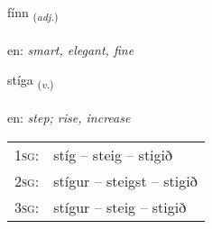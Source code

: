 \documentclass[frontgrid, backgrid]{flacards}\usepackage[]{graphicx}\usepackage[]{color}
\begin{document}
\renewcommand{\flhead}{\vskip5pt \fboxsep=0pt {\small\bfseries\footnotesize Lýsingarorð | Adjective}}
\renewcommand{\fcfoot}{\vskip5pt \fboxsep=0pt \hspace{2pt}{\small\bfseries\footnotesize 2K}}

\renewcommand{\blhead}{\vskip5pt {\small\bfseries\footnotesize Lýsingarorð | Adjective }}
\renewcommand{\bcfoot}{\vskip5pt \hspace{2pt}{\small\bfseries\footnotesize 2K}}


{fínn \small{\textsubscript{(\textit{adj.})}} \\[1ex] %
\textphonetic{[fitn̥]} \\
en: \emph{smart, elegant, fine} \\  [2ex]
\renewcommand*{\arraystretch}{0.8}
}

\renewcommand{\flhead}{\vskip5pt \fboxsep=0pt {\small\bfseries\footnotesize Sagnorð | Verb}}
\renewcommand{\fcfoot}{\vskip5pt \fboxsep=0pt \hspace{2pt}{\small\bfseries\footnotesize 2K}}

\renewcommand{\blhead}{\vskip5pt {\small\bfseries\footnotesize Sagnorð | Verb }}
\renewcommand{\bcfoot}{\vskip5pt \hspace{2pt}{\small\bfseries\footnotesize 2K}}


{stíga \small{\textsubscript{(\textit{v.})}} \\[1ex] %
\textphonetic{[stiːɣa]} \\
en: \emph{step; rise, increase} \\  [2ex]
\renewcommand*{\arraystretch}{0.8}
\begin{tabular}{p{1cm}l}
\textsc{1sg}: & stíg -- steig -- stigið \\ 
\textsc{2sg}: & stígur -- steigst -- stigið \\ 
\textsc{3sg}: & stígur -- steig -- stigið \\ 
\end{tabular}
}
\end{document}
